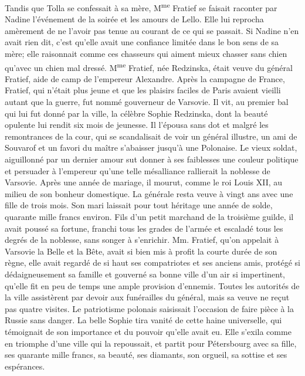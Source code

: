 
Tandis que Tolla se confessait à sa mère, M\textsuperscript{me} Fratief
se faisait raconter par Nadine l'événement de la soirée et les amours de
Lello. Elle lui reprocha amèrement de ne l'avoir pas tenue au courant de
ce qui se passait. Si Nadine n'en avait rien dit, c'est qu'elle avait
une confiance limitée dans le bon sens de sa mère; elle raisonnait comme
ces chasseurs qui aiment mieux chasser sans chien qu'avec un chien mal
dressé. M\textsuperscript{me} Fratief, née Redzinska, était veuve du
général Fratief, aide de camp de l'empereur Alexandre. Après la campagne
de France, Fratief, qui n'était plus jeune et que les plaisirs faciles
de Paris avaient vieilli autant que la guerre, fut nommé gouverneur de
Varsovie. Il vit, au premier bal qui lui fut donné par la ville, la
célèbre Sophie Redzinska, dont la beauté opulente lui rendit six mois de
jeunesse. Il l'épousa sans dot et malgré les remontrances de la cour,
qui se scandalisait de voir un général illustre, un ami de Souvarof et
un favori du maître s'abaisser jusqu'à une Polonaise. Le vieux soldat,
aiguillonné par un dernier amour sut donner à ses faiblesses une couleur
politique et persuader à l'empereur qu'une telle mésalliance rallierait
la noblesse de Varsovie. Après une année de mariage, il mourut, comme le
roi Louis XII, au milieu de son bonheur domestique. La générale resta
veuve à vingt ans avec une fille de trois mois. Son mari laissait pour
tout héritage une année de solde, quarante mille francs environ. Fils
d'un petit marchand de la troisième guilde, il avait poussé sa fortune,
franchi tous les grades de l'armée et escaladé tous les degrés de la
noblesse, sans songer à s'enrichir. Mm. Fratief, qu'on appelait à
Varsovie la Belle et la Bête, avait si bien mis à profit la courte durée
de son règne, elle avait regardé de si haut ses compatriotes et ses
anciens amis, protégé si dédaigneusement sa famille et gouverné sa bonne
ville d'un air si impertinent, qu'elle fit en peu de temps une ample
provision d'ennemis. Toutes les autorités de la ville assistèrent par
devoir aux funérailles du général, mais sa veuve ne reçut pas quatre
visites. Le patriotisme polonais saisissait l'occasion de faire pièce à
la Russie sans danger. La belle Sophie tira vanité de cette haine
universelle, qui témoignait de son importance et du pouvoir qu'elle
avait eu. Elle s'exila comme en triomphe d'une ville qui la repoussait,
et partit pour Pétersbourg avec sa fille, ses quarante mille francs, sa
beauté, ses diamants, son orgueil, sa sottise et ses espérances.

